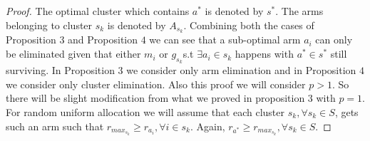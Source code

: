 \begin{proof}
The optimal cluster which contains $a^{*}$ is denoted by $s^{*}$. The arms belonging to cluster $s_{k}$ is denoted by $A_{s_{k}}$. Combining both the cases of Proposition $3$ and Proposition $4$ we can see that a sub-optimal arm $a_{i}$ can only be eliminated given that either $m_{i}$ or $g_{s_{k}}$s.t $\exists a_{i}\in s_{k}$ happens with $a^{*}\in s^{*}$ still surviving. In Proposition $3$ we consider only arm elimination and in Proposition $4$ we consider only cluster elimination. Also this proof we will consider $p>1$. So there will be slight modification from what we proved in proposition $3$ with $p=1$. For random uniform allocation we will assume that each cluster $s_{k},\forall s_{k}\in S$, gets such an arm such that $r_{{max_{s_{k}}}}\geq r_{a_{i}},\forall i\in s_{k}$. Again, $r_{a^{*}}\geq r_{{max_{s_{k}}}}, \forall s_{k}\in S$.

\end{proof}
